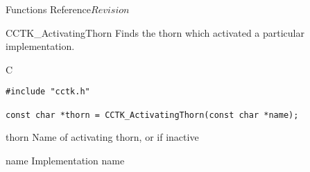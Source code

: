 \begin{cactuspart}{ Functions Reference}{}{$Revision$}
\begin{FunctionDescription}{CCTK\_ActivatingThorn}
\label{CCTK-ActivatingThorn}
Finds the thorn which activated a particular implementation.

\begin{SynopsisSection}
\begin{Synopsis}{C}
\begin{verbatim}
#include "cctk.h"

const char *thorn = CCTK_ActivatingThorn(const char *name);
\end{verbatim}
\end{Synopsis}
\end{SynopsisSection}

\begin{ResultSection}
\begin{Result}{thorn}
Name of activating thorn, or  if inactive
\end{Result}
\end{ResultSection}

\begin{ParameterSection}
\begin{Parameter}{name}
Implementation name
\end{Parameter}
\end{ParameterSection}


\end{FunctionDescription}
\end{cactuspart}
